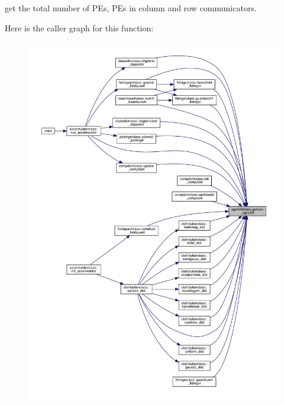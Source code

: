 get the total number of P\+Es, P\+Es in column and row communicators. 

Here is the caller graph for this function\+:
\nopagebreak
\begin{figure}[H]
\begin{center}
\leavevmode
\includegraphics[width=350pt]{namespacepgrid2dclass_ac088657db5b1deb05bb1ec732579ba53_icgraph}
\end{center}
\end{figure}
